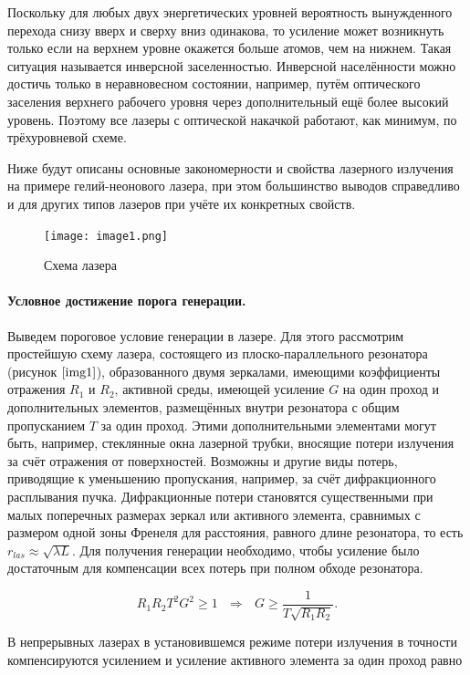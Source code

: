 \documentclass[a4paper,12pt]{article} %
\begin{document}
Поскольку для любых двух энергетических уровней вероятность вынужденного перехода снизу вверх и сверху вниз одинакова, то усиление может возникнуть только если на верхнем уровне окажется больше атомов, чем на нижнем. Такая ситуация называется инверсной заселенностью. Инверсной населённости можно достичь только в неравновесном состоянии, например, путём оптического заселения верхнего рабочего уровня через дополнительный ещё более высокий уровень. Поэтому все лазеры с оптической накачкой работают, как минимум, по трёхуровневой схеме. 

Ниже будут описаны основные закономерности и свойства лазерного излучения на примере гелий-неонового лазера, при этом большинство выводов справедливо и для других типов лазеров при учёте их конкретных свойств.

\begin{figure}[h]
\begin{center}
    \texttt{[image: image1.png]}
\end{center}
    \caption{Схема лазера}
    \label{img1}
\end{figure}

\paragraph{Условное достижение порога генерации.} Выведем пороговое условие генерации в лазере. Для этого рассмотрим простейшую схему лазера, состоящего из плоско-параллельного резонатора (рисунок $\ref{img1}$), образованного двумя зеркалами, имеющими коэффициенты отражения $R_1$ и $R_2$, активной среды, имеющей усиление $G$ на один проход и дополнительных элементов, размещённых внутри резонатора с общим пропусканием $T$ за один проход. Этими дополнительными элементами могут быть, например, стеклянные окна лазерной трубки, вносящие потери излучения за счёт отражения от поверхностей. Возможны и другие виды потерь, приводящие к уменьшению пропускания, например, за счёт дифракционного расплывания пучка. Дифракционные потери становятся существенными при малых поперечных размерах зеркал или активного элемента, сравнимых с размером одной зоны Френеля для расстояния, равного длине резонатора, то есть $r_{las}\approx\sqrt{\lambda L}$. Для получения генерации необходимо, чтобы усиление было достаточным для компенсации всех потерь при полном обходе резонатора.

\[ R_1R_2T^2G^2\geq1\text{ } \Rightarrow\text{ } G\geq \frac{1}{T\sqrt{R_1R_2}}. \]

В непрерывных лазерах в установившемся режиме потери излучения в точности компенсируются усилением и усиление активного элемента за один проход равно
\end{document}

